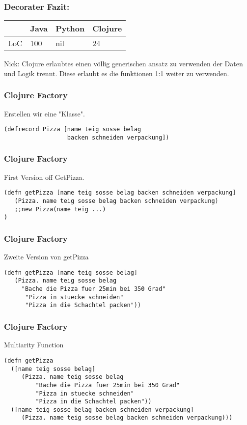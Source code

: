 \documentclass[compress, blue]{beamer}
\begin{document}



\begin{frame}\frametitle{Decorater Fazit:}
    \begin{tabular}{l | l l l}
     & Java &  Python & Clojure  \\
     \hline
    LoC & 100 &  nil & 24  \\
  \end{tabular}
  \begin{block}{Nick: }
    Clojure erlaubtes einen völlig generischen ansatz zu verwenden der
    Daten und Logik trennt. Diese erlaubt es die funktionen 1:1 weiter
    zu verwenden.
  \end{block}
\end{frame}

\begin{frame}[fragile]\frametitle{Clojure Factory}
  Erstellen wir eine "Klasse".
  \begin{lstlisting}
(defrecord Pizza [name teig sosse belag 
                  backen schneiden verpackung])
  \end{lstlisting}
  \pause
\end{frame}

\begin{frame}[fragile]\frametitle{Clojure Factory}

First Version off GetPizza.

  \begin{lstlisting}
(defn getPizza [name teig sosse belag backen schneiden verpackung] 
   (Pizza. name teig sosse belag backen schneiden verpackung)
   ;;new Pizza(name teig ...)
)
  \end{lstlisting}
\end{frame}

\begin{frame}[fragile]\frametitle{Clojure Factory}

Zweite Version von getPizza

  \begin{lstlisting}
(defn getPizza [name teig sosse belag]
   (Pizza. name teig sosse belag
     "Bache die Pizza fuer 25min bei 350 Grad"
      "Pizza in stuecke schneiden"
      "Pizza in die Schachtel packen"))
  \end{lstlisting}
\end{frame}

\begin{frame}[fragile]\frametitle{Clojure Factory}

Multiarity Function
 
  \begin{lstlisting}
(defn getPizza
  ([name teig sosse belag]
     (Pizza. name teig sosse belag
         "Bache die Pizza fuer 25min bei 350 Grad"
         "Pizza in stuecke schneiden"
         "Pizza in die Schachtel packen"))
  ([name teig sosse belag backen schneiden verpackung] 
     (Pizza. name teig sosse belag backen schneiden verpackung)))
  \end{lstlisting}
\end{frame}
\end{document}
